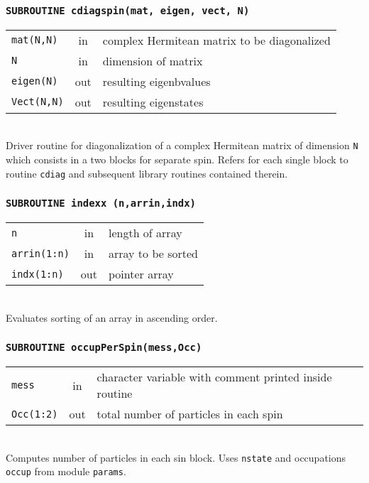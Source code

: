 \documentclass[final,1p]{elsarticle}
\begin{document}
\subsubsection*{\tt SUBROUTINE cdiagspin(mat, eigen, vect, N)}
\begin{tabular}{lcl}
 {\tt mat(N,N)} & in & complex Hermitean matrix to be diagonalized\\
 {\tt N} & in & dimension of matrix\\
 {\tt eigen(N)} & out & resulting eigenbvalues\\
 {\tt Vect(N,N)} & out & resulting eigenstates\\
\end{tabular}
\\[4pt]
Driver routine for diagonalization of a complex Hermitean matrix of
dimension {\tt N} which consists in a two blocks for separate spin.
Refers for each single block to routine {\tt cdiag} and subsequent
library routines contained therein.


\subsubsection*{\tt SUBROUTINE indexx (n,arrin,indx)}
\begin{tabular}{lcl}
 {\tt n} & in & length of array\\
 {\tt arrin(1:n)} & in & array to be sorted\\
 {\tt indx(1:n)} & out & pointer array \\
\end{tabular}
\\[4pt]
Evaluates sorting of an array in ascending order.



\subsubsection*{\tt SUBROUTINE occupPerSpin(mess,Occ)}
\begin{tabular}{lcl}
 {\tt mess} & in & character variable with comment printed inside routine\\
 {\tt Occ(1:2)} & out & total number of particles in each spin\\
\end{tabular}
\\[4pt]
Computes number of particles in each sin block. Uses {\tt nstate} and
occupations {\tt occup} from module {\tt params}.
\end{document}

